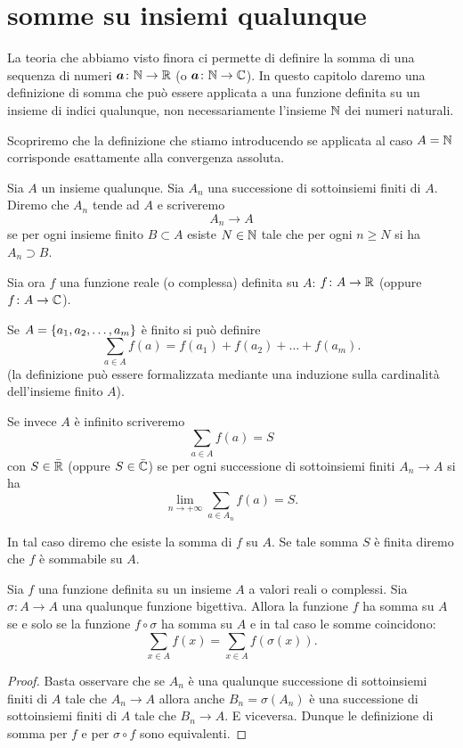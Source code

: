 \section{somme su insiemi qualunque}

La teoria che abbiamo visto finora ci permette di definire
la somma di una sequenza di numeri $\boldsymbol a \colon \mathbb N\to \mathbb R$
(o $\boldsymbol a \colon \mathbb N \to \mathbb C$).
In questo capitolo daremo una definizione di somma che può
essere applicata a una funzione definita su un insieme di indici qualunque, non necessariamente l'insieme $\mathbb N$ dei
numeri naturali.

Scopriremo che la definizione che stiamo introducendo se
applicata al caso $A=\mathbb N$ corrisponde esattamente alla convergenza assoluta.

\begin{definition}
Sia $A$ un insieme qualunque.
Sia $A_n$ una successione di sottoinsiemi finiti di $A$.
Diremo che $A_n$ tende ad $A$ e scriveremo
\[
  A_n \to A
\]
se per ogni insieme finito $B\subset A$ esiste $N\in \mathbb N$
tale che per ogni $n\ge N$ si ha $A_n\supset B$.

Sia ora $f$ una funzione reale (o complessa) definita
su $A$: $f\colon A \to \mathbb R$ (oppure $f\colon A \to \mathbb C$).

Se $A = {\left\{ a_1, a_2, \dots, a_m \right\}}$ è finito si può definire
\[
  \sum_{a \in A} f(a) = f(a_1) + f(a_2) + \dots + f(a_m).
\]
(la definizione può essere formalizzata mediante una
induzione sulla cardinalità dell'insieme finito $A$).

Se invece $A$ è infinito scriveremo
\[
  \sum_{a\in A} f(a) = S
\]
con $S\in \bar {\mathbb R}$ (oppure $S\in \bar {\mathbb C}$)
se per ogni successione di sottoinsiemi finiti $A_n \to A$
si ha
\begin{equation}\label{eq:589421}
  \lim_{n\to +\infty}\sum_{a\in A_n}f(a) = S.
\end{equation}

In tal caso diremo che esiste la somma di $f$ su $A$.
Se tale somma $S$ è finita diremo che $f$ è sommabile su $A$.
\end{definition}

\begin{theorem}
  Sia $f$ una funzione definita su un insieme $A$
  a valori reali o complessi. Sia $\sigma\colon A \to A$
  una qualunque funzione bigettiva.
  Allora la funzione $f$ ha somma su $A$ se e solo se
  la funzione $f\circ \sigma$ ha somma su $A$ e in tal
  caso le somme coincidono:
  \[
    \sum_{x\in A} f(x) = \sum_{x\in A} f(\sigma(x)).
  \]
\end{theorem}
%
\begin{proof}
  Basta osservare che se $A_n$ è una qualunque successione
  di sottoinsiemi finiti di $A$ tale che $A_n\to A$
  allora anche $B_n=\sigma(A_n)$ è una successione
  di sottoinsiemi finiti di $A$ tale che $B_n\to A$.
  E viceversa.
  Dunque le definizione di somma per $f$ e per $\sigma\circ f$ sono equivalenti.
\end{proof}

